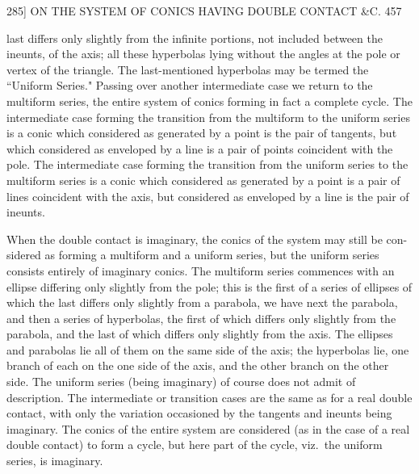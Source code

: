\documentclass[11pt]{article}
\begin{document}
\begin{center}
\textsc{285]} \hfill ON THE SYSTEM OF CONICS HAVING DOUBLE CONTACT \&C. \hfill 457
\end{center}

last differs only slightly from the infinite portions, not included between the ineunts,
of the axis; all these hyperbolas lying without the angles at the pole or vertex of
the triangle. The last-mentioned hyperbolas may be termed the ``Uniform Series."
Passing over another intermediate case we return to the multiform series, the entire
system of conics forming in fact a complete cycle. The intermediate case forming the
transition from the multiform to the uniform series is a conic which considered as
generated by a point is the pair of tangents, but which considered as enveloped by
a line is a pair of points coincident with the pole. The intermediate case forming the
transition from the uniform series to the multiform series is a conic which considered
as generated by a point is a pair of lines coincident with the axis, but considered
as enveloped by a line is the pair of ineunts.

\smallskip

When the double contact is imaginary, the conics of the system may still be con-
sidered as forming a multiform and a uniform series, but the uniform series consists
entirely of imaginary conics. The multiform series commences with an ellipse differing
only slightly from the pole; this is the first of a series of ellipses of which the last
differs only slightly from a parabola, we have next the parabola, and then a series of
hyperbolas, the first of which differs only slightly from the parabola, and the last of
which differs only slightly from the axis. The ellipses and parabolas lie all of them
on the same side of the axis; the hyperbolas lie, one branch of each on the one side
of the axis, and the other branch on the other side. The uniform series (being
imaginary) of course does not admit of description. The intermediate or transition
cases are the same as for a real double contact, with only the variation occasioned
by the tangents and ineunts being imaginary. The conics of the entire system are
considered (as in the case of a real double contact) to form a cycle, but here part
of the cycle, viz.\ the uniform series, is imaginary.

\smallskip
\end{document}
